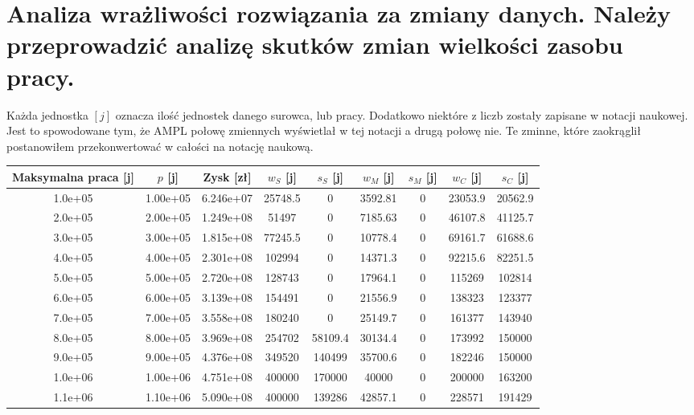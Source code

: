 \documentclass{article}
\begin{document}
\section{Analiza wrażliwości rozwiązania za zmiany danych. Należy przeprowadzić analizę skutków zmian wielkości zasobu pracy.}

Każda jednostka $[j]$ oznacza ilość jednostek danego surowca, lub pracy. Dodatkowo niektóre z liczb zostały zapisane w notacji naukowej. Jest to spowodowane tym, że AMPL połowę zmiennych wyświetlał w tej notacji a drugą połowę nie. Te zminne, które
zaokrąglił postanowiłem przekonwertować w całości na notację naukową.

\begin{table}[H]
  \begin{center}
    \begin{tabular}{|c| c| c| c| c| c| c| c| c| }
      \hline
      Maksymalna praca [j]& $p$ [j]& Zysk [zł] & $w_S$ [j]& $s_S$ [j]& $w_M$ [j]& $s_M$ [j]& $w_C$ [j]& $s_C$ [j] \\
      \hline
      1.0e+05  &1.00e+05  &6.246e+07  &25748.5  &0        &3592.81  &0  &23053.9  &20562.9 \\ \hline
      2.0e+05  &2.00e+05  &1.249e+08  &51497    &0        &7185.63  &0  &46107.8  &41125.7 \\ \hline
      3.0e+05  &3.00e+05  &1.815e+08  &77245.5  &0        &10778.4  &0  &69161.7  &61688.6 \\ \hline
      4.0e+05  &4.00e+05  &2.301e+08  &102994   &0        &14371.3  &0  &92215.6  &82251.5 \\ \hline
      5.0e+05  &5.00e+05  &2.720e+08  &128743   &0        &17964.1  &0  &115269   &102814 \\ \hline
      6.0e+05  &6.00e+05  &3.139e+08  &154491   &0        &21556.9  &0  &138323   &123377 \\ \hline
      7.0e+05  &7.00e+05  &3.558e+08  &180240   &0        &25149.7  &0  &161377   &143940 \\ \hline
      8.0e+05  &8.00e+05  &3.969e+08  &254702   &58109.4  &30134.4  &0  &173992   &150000 \\ \hline
      9.0e+05  &9.00e+05  &4.376e+08  &349520   &140499   &35700.6  &0  &182246   &150000 \\ \hline
      1.0e+06  &1.00e+06  &4.751e+08  &400000   &170000   &40000    &0  &200000   &163200 \\ \hline
      1.1e+06  &1.10e+06  &5.090e+08  &400000   &139286   &42857.1  &0  &228571   &191429 \\ \hline

\end{tabular}
\end{center}
\end{table}
\end{document}
